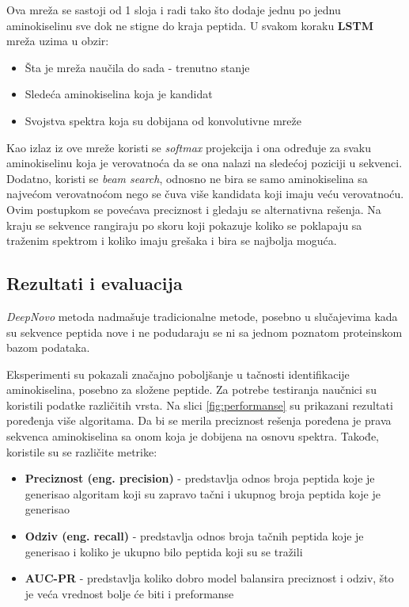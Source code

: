 \documentclass[12pt,oneside]{memoir}
\begin{document}
Ova mreža se sastoji od 1 sloja i radi tako što dodaje jednu po jednu aminokiselinu sve dok ne stigne do kraja peptida. U svakom koraku \textbf{LSTM} mreža uzima u obzir:
\begin{itemize}
    \item Šta je mreža naučila do sada - trenutno stanje
    \item Sledeća aminokiselina koja je kandidat
    \item Svojstva spektra koja su dobijana od konvolutivne mreže
\end{itemize}

Kao izlaz iz ove mreže koristi se \emph{softmax} projekcija i ona određuje za svaku aminokiselinu koja je verovatnoća da se ona nalazi na sledećoj poziciji u sekvenci. Dodatno, koristi se \emph{beam search}, odnosno ne bira se samo aminokiselina sa najvećom verovatnoćom nego se čuva više kandidata koji imaju veću verovatnoću. Ovim postupkom se povećava preciznost i gledaju se alternativna rešenja. Na kraju se sekvence rangiraju po skoru koji pokazuje koliko se poklapaju sa traženim spektrom i koliko imaju grešaka i bira se najbolja moguća.

\subsection{Rezultati i evaluacija}

\emph{DeepNovo} metoda nadmašuje tradicionalne metode, posebno u slučajevima kada su sekvence peptida nove i ne podudaraju se ni sa jednom poznatom proteinskom bazom podataka.

Eksperimenti su pokazali značajno poboljšanje u tačnosti identifikacije aminokiselina, posebno za složene peptide. Za potrebe testiranja naučnici su koristili podatke različitih vrsta. Na slici \ref{fig:performanse} su prikazani rezultati poređenja više algoritama. Da bi se merila preciznost rešenja poređena je prava sekvenca aminokiselina sa onom koja je dobijena na osnovu spektra. 
Takođe, koristile su se različite metrike:
\begin{itemize}
    \item \textbf{Preciznost (eng. precision)} - predstavlja odnos broja peptida koje je generisao algoritam koji su zapravo tačni i ukupnog broja peptida koje je generisao
    \item \textbf{Odziv (eng. recall)} - predstavlja  odnos broja tačnih peptida koje je generisao i koliko je ukupno bilo peptida koji su se tražili
    \item \textbf{AUC-PR} - predstavlja koliko dobro model balansira preciznost i odziv, što je veća vrednost bolje će biti i preformanse
\end{itemize}
\end{document}

